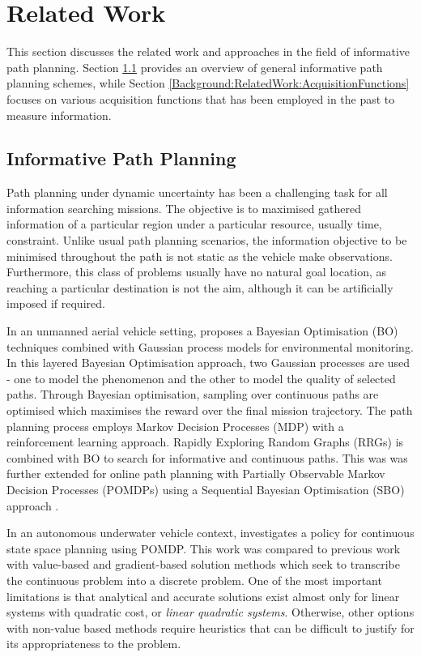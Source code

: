 	\section{Related Work}
	\label{Background:RelatedWork}
		
		This section discusses the related work and approaches in the field of informative path planning. Section \ref{Background:RelatedWork:InformativePathPlanning} provides an overview of general informative path planning schemes, while Section \ref{Background:RelatedWork:AcquisitionFunctions} focuses on various acquisition functions that has been employed in the past to measure information.
				
		\subsection{Informative Path Planning}
		\label{Background:RelatedWork:InformativePathPlanning}
			
			Path planning under dynamic uncertainty has been a challenging task for all information searching missions. The objective is to maximised gathered information of a particular region under a particular resource, usually time, constraint. Unlike usual path planning scenarios, the information objective to be minimised throughout the path is not static as the vehicle make observations. Furthermore, this class of problems usually have no natural goal location, as reaching a particular destination is not the aim, although it can be artificially imposed if required.
		
			In an unmanned aerial vehicle setting, \cite{Roman:BayesianOptimisation} proposes a Bayesian Optimisation (BO) techniques combined with Gaussian process models for environmental monitoring. In this layered Bayesian Optimisation approach, two Gaussian processes are used - one to model the phenomenon and the other to model the quality of selected paths. Through Bayesian optimisation, sampling over continuous paths are optimised which maximises the reward over the final mission trajectory. The path planning process employs Markov Decision Processes (MDP) with a reinforcement learning approach. Rapidly Exploring Random Graphs (RRGs) is combined with BO to search for informative and continuous paths. This was was further extended for online path planning with Partially Observable Markov Decision Processes (POMDPs) using a Sequential Bayesian Optimisation (SBO) approach \citep{Roman:SequentialBayesianOptimisation}.
			
			In an autonomous underwater vehicle context, \cite{ParametricPOMDP} investigates a policy for continuous state space planning using POMDP. This work was compared to previous work with value-based and gradient-based solution methods which seek to transcribe the continuous problem into a discrete problem. One of the most important limitations is that analytical and accurate solutions exist almost only for linear systems with quadratic cost, or \textit{linear quadratic systems}. Otherwise, other options with non-value based methods require heuristics that can be difficult to justify for its appropriateness to the problem. 
			
